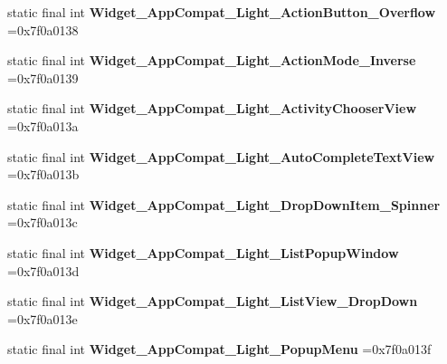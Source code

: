\begin{DoxyCompactItemize}
\item 
\mbox{\label{classproject4_1_1xaria_1_1R_1_1style_afd5b6ee5e7c0d1716908cd10544edfba}} 
static final int {\bfseries Widget\+\_\+\+App\+Compat\+\_\+\+Light\+\_\+\+Action\+Button\+\_\+\+Overflow} =0x7f0a0138
\item 
\mbox{\label{classproject4_1_1xaria_1_1R_1_1style_a6762048e4e1e4f595ab93770747d4e20}} 
static final int {\bfseries Widget\+\_\+\+App\+Compat\+\_\+\+Light\+\_\+\+Action\+Mode\+\_\+\+Inverse} =0x7f0a0139
\item 
\mbox{\label{classproject4_1_1xaria_1_1R_1_1style_af9bdf785201ab9f40ff94ef21f63f264}} 
static final int {\bfseries Widget\+\_\+\+App\+Compat\+\_\+\+Light\+\_\+\+Activity\+Chooser\+View} =0x7f0a013a
\item 
\mbox{\label{classproject4_1_1xaria_1_1R_1_1style_ad27a1a96510aa6a326516abf0a9d7afc}} 
static final int {\bfseries Widget\+\_\+\+App\+Compat\+\_\+\+Light\+\_\+\+Auto\+Complete\+Text\+View} =0x7f0a013b
\item 
\mbox{\label{classproject4_1_1xaria_1_1R_1_1style_ae2ec14ab618b40cbc984f597275721b4}} 
static final int {\bfseries Widget\+\_\+\+App\+Compat\+\_\+\+Light\+\_\+\+Drop\+Down\+Item\+\_\+\+Spinner} =0x7f0a013c
\item 
\mbox{\label{classproject4_1_1xaria_1_1R_1_1style_a011713db95765f8b76176a33b75ceba9}} 
static final int {\bfseries Widget\+\_\+\+App\+Compat\+\_\+\+Light\+\_\+\+List\+Popup\+Window} =0x7f0a013d
\item 
\mbox{\label{classproject4_1_1xaria_1_1R_1_1style_ab7dd04411909c6d0c974067b2567025b}} 
static final int {\bfseries Widget\+\_\+\+App\+Compat\+\_\+\+Light\+\_\+\+List\+View\+\_\+\+Drop\+Down} =0x7f0a013e
\item 
\mbox{\label{classproject4_1_1xaria_1_1R_1_1style_a7ec1670dd3886750c859f1d12709454b}} 
static final int {\bfseries Widget\+\_\+\+App\+Compat\+\_\+\+Light\+\_\+\+Popup\+Menu} =0x7f0a013f

\end{DoxyCompactItemize}
